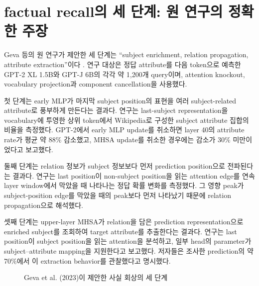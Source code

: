 \section{factual recall의 세 단계: 원 연구의 정확한 주장}

Geva 등의 원 연구가 제안한 세 단계는 ``subject enrichment, relation propagation, attribute extraction''이다 \citep{geva2023recall}.
연구 대상은 정답 attribute를 다음 token으로 예측한 GPT-2 XL 1.5B와 GPT-J 6B의 각각 약 1,200개 query이며, attention knockout, vocabulary projection과 component cancellation을 사용했다.

첫 단계는 early MLP가 마지막 subject position의 표현을 여러 subject-related attribute로 풍부하게 만든다는 결과다.
연구는 last-subject representation을 vocabulary에 투영한 상위 token에서 Wikipedia로 구성한 subject attribute 집합의 비율을 측정했다.
GPT-2에서 early MLP update를 취소하면 layer 40의 attribute rate가 평균 약 88\% 감소했고, MHSA update를 취소한 경우에는 감소가 30\% 미만이었다고 보고했다.

둘째 단계는 relation 정보가 subject 정보보다 먼저 prediction position으로 전파된다는 결과다.
연구는 last position이 non-subject position을 읽는 attention edge를 연속 layer window에서 막았을 때 나타나는 정답 확률 변화를 측정했다.
그 영향 peak가 subject-position edge를 막았을 때의 peak보다 먼저 나타났기 때문에 relation propagation으로 해석했다.

셋째 단계는 upper-layer MHSA가 relation을 담은 prediction representation으로 enriched subject를 조회하여 target attribute를 추출한다는 결과다.
연구는 last position이 subject position을 읽는 attention을 분석하고, 일부 head의 parameter가 subject--attribute mapping을 지원한다고 보고했다.
저자들은 조사한 prediction의 약 70\%에서 이 extraction behavior를 관찰했다고 명시했다.

\begin{figure}[htbp]
\centering
{}
\caption{Geva et al. (2023)이 제안한 사실 회상의 세 단계}
\label{fig:geva-three-stages}
\end{figure}

